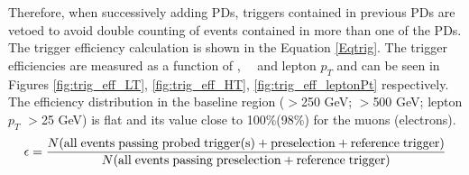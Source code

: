Therefore, when successively adding PDs, triggers contained in previous PDs are vetoed to avoid double counting of events contained in more than one of the PDs.
The trigger efficiency calculation is shown in the Equation \ref{Eqtrig}. The trigger efficiencies are measured as a function of \LT, \, \HT\, and lepton $p_T$ and can be seen in Figures \ref{fig:trig_eff_LT}, \ref{fig:trig_eff_HT}, \ref{fig:trig_eff_leptonPt} respectively.
The efficiency distribution in the baseline region (\LT$>$250 GeV; \HT$>$500 GeV; lepton $p_T$ $>$25 GeV) is flat and its value close to 100\%(98\%) for the muons (electrons).
\begin{equation}
\label{Eqtrig}
  \epsilon = \frac{N({\rm all \; events \; passing \; probed \; trigger(s) +
  preselection + reference \; trigger})}{N({\rm all \; events \; passing
  \;preselection + reference \; trigger})}
\end{equation}

